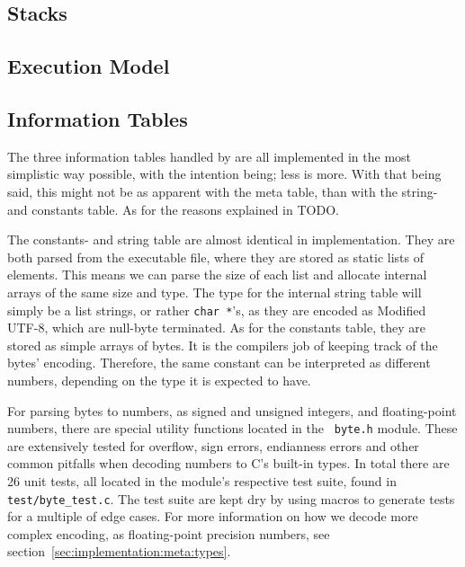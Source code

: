 \subsection{Stacks}
\label{sec:implementation:stacks}



\subsection{Execution Model}
% 


\subsection{Information Tables}
\label{sec:implementation:infotables}
The three information tables handled by \thename{} are all implemented in the
most simplistic way possible, with the intention being; less is more. With that
being said, this might not be as apparent with the meta table, than with the
string- and constants table. As for the reasons explained in TODO.

The constants- and string table are almost identical in implementation. They are
both parsed from the executable file, where they are stored as static lists of
elements. This means we can parse the size of each list and allocate internal
arrays of the same size and type. The type for the internal string table will
simply be a list strings, or rather {\tt char *}'s, as they are encoded as
Modified UTF-8, which are null-byte terminated. As for the constants table, they
are stored as simple arrays of bytes. It is the compilers job of keeping track
of the bytes' encoding. Therefore, the same constant can be interpreted as
different numbers, depending on the type it is expected to have.

For parsing bytes to numbers, as signed and unsigned integers, and
floating-point numbers, there are special utility functions located in the {\tt
  byte.h} module. These are extensively tested for overflow, sign errors,
endianness errors and other common pitfalls when decoding numbers to C's
built-in types. In total there are 26 unit tests, all located in the module's
respective test suite, found in {\tt test/byte\_test.c}. The test suite are kept
dry by using macros to generate tests for a multiple of edge cases. For more
information on how we decode more complex encoding, as floating-point precision
numbers, see section~\ref{sec:implementation:meta:types}.

